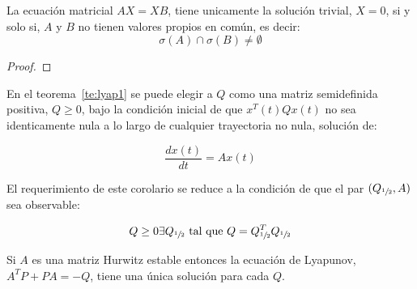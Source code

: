         \begin{lema}
            La ecuación matricial $A X = X B$, tiene unicamente la solución trivial, $X=0$, si y solo si, $A$ y $B$ no tienen valores propios en común, es decir:
            \begin{equation*}
                \sigma(A) \cap \sigma(B) \ne \emptyset
            \end{equation*}
        \end{lema}

        \begin{proof}
        \end{proof}

        \begin{corolario} \label{co:lyap1}
            En el teorema~\ref{te:lyap1} se puede elegir a $Q$ como una matriz semidefinida positiva, $Q \ge 0$, bajo la condición inicial de que $x^T(t) Q x(t)$ no sea identicamente nula a lo largo de cualquier trayectoria no nula, solución de:

            \begin{equation*}
                \frac{d x(t)}{dt} = A x(t)
            \end{equation*}

            El requerimiento de este corolario se reduce a la condición de que el par $(Q_{\sfrac{1}{2}}, A)$ sea observable:

            \begin{equation*}
                Q \ge 0 \exists Q_{\sfrac{1}{2}} \text{ tal que } Q = Q_{\sfrac{1}{2}}^T Q_{\sfrac{1}{2}}
            \end{equation*}
        \end{corolario}

        \begin{corolario} \label{co:lyap2}
            Si $A$ es una matriz Hurwitz estable entonces la ecuación de Lyapunov, $A^T P + P A = -Q$, tiene una única solución para cada $Q$.
        \end{corolario}

